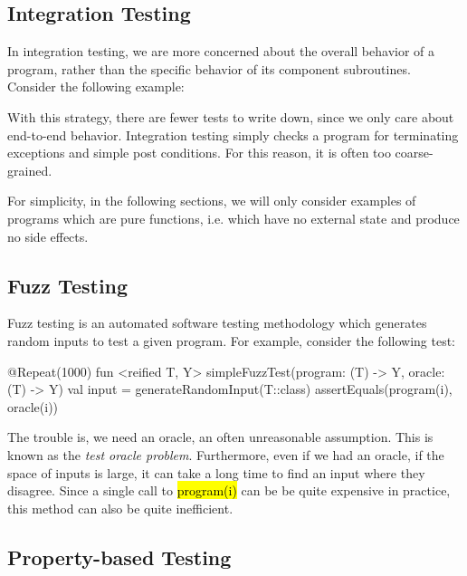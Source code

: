 \documentclass[12pt,initial,twoside,maitrise]{dms}
\newcommand{\inline}[1]{%
\begingroup%
\sethlcolor{slightgray}%
\hl{\ttfamily\small #1}%
\endgroup
}
\numberwithin{equation}{section}
\numberwithin{table}{chapter}
\numberwithin{figure}{chapter}
\begin{document}
\subsection{Integration Testing}

\noindent In integration testing, we are more concerned about the overall behavior of a program, rather than the specific behavior of its component subroutines. Consider the following example:

%
With this strategy, there are fewer tests to write down, since we only care about end-to-end behavior. Integration testing simply checks a program for terminating exceptions and simple post conditions. For this reason, it is often too coarse-grained.

For simplicity, in the following sections, we will only consider examples of programs which are pure functions, i.e. which have no external state and produce no side effects.

\subsection{Fuzz Testing}

Fuzz testing is an automated software testing methodology which generates random inputs to test a given program. For example, consider the following test:
%
\begin{kotlinlisting}
@Repeat(1000)
fun <reified T, Y> simpleFuzzTest(program: (T) -> Y, oracle: (T) -> Y) {
        val input = generateRandomInput(T::class)
        assertEquals(program(i), oracle(i))
}
\end{kotlinlisting}
%
The trouble is, we need an oracle, an often unreasonable assumption. This is known as the \textit{test oracle problem}. Furthermore, even if we had an oracle, if the space of inputs is large, it can take a long time to find an input where they disagree. Since a single call to \inline{program(i)} can be be quite expensive in practice, this method can also be quite inefficient.

\subsection{Property-based Testing}\label{subsec:property-based-testing}
\end{document}

